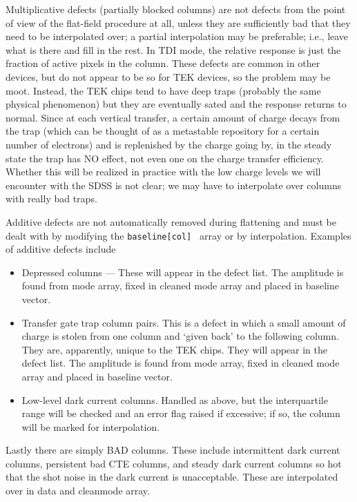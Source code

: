 Multiplicative defects (partially blocked columns) are not defects
from the point of view of the flat-field procedure at all, unless they are
sufficiently bad that they need to be interpolated over; a partial
interpolation may be preferable; i.e., leave what is there and fill in the
rest.  In TDI mode, the relative response is just the fraction of active
pixels in the column.  These defects are common in other devices, but
do not appear to be so for TEK devices, so the problem
may be moot.  Instead, the TEK chips tend to have deep traps (probably
the same physical phenomenon) but they are eventually sated
and the response returns to normal.  Since at each vertical transfer, a
certain amount of charge decays from the trap (which can be thought of
as a metastable repository for a certain number of electrons) and is
replenished by the charge going by, in the steady state the trap has NO
effect, not even one on the charge transfer efficiency.  Whether this
will be realized in practice with the low charge levels we will
encounter with the SDSS is not clear; we may have to interpolate over
columns with really bad traps.  
 
Additive defects are not automatically removed during flattening and
must be dealt with by modifying the {\tt baseline[col] } array or
by interpolation. Examples of additive defects include
 
\begin{itemize}

\item Depressed columns --- These will appear in the defect list. The
amplitude is found from mode array, fixed in cleaned mode array and
placed in baseline vector.
 
\item Transfer gate trap column pairs. 
This is a defect in which a small amount of charge
is stolen from one column and `given back' to the following column. They
are, apparently, unique to the TEK chips. They will appear in the
defect list. The amplitude is found from mode array, fixed in cleaned
mode array and placed in baseline vector.
 
\item Low-level dark current columns. Handled as above, but the interquartile
range will be checked and an error flag raised if excessive; if so,
the column will be marked for interpolation.

\end{itemize}

Lastly there are simply BAD columns. These include intermittent dark 
current columns, persistent bad CTE columns, 
and steady dark current columns so hot
that the shot noise in the dark current is unacceptable.
These are interpolated over in data and cleanmode array.
 
